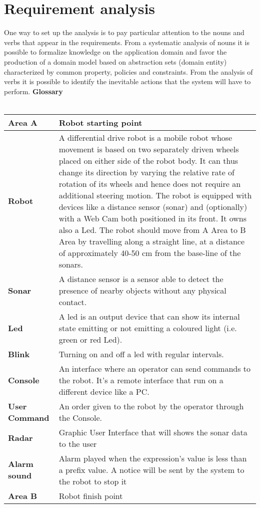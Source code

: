 \section{Requirement analysis}
One way to set up the analysis is to pay particular attention to the nouns and verbs that appear in the requirements. From a systematic analysis of nouns it is possible to formalize knowledge on the application domain and favor the production of a domain model based on abstraction sets (domain entity) characterized by common property, policies and constraints. From the analysis of verbs it is possible to identify the inevitable actions that the system will have to perform.
\clearpage
\textbf{Glossary}\\\\
\begin{tabular}{| l | p{10cm} |}
\hline
\textbf{Area A} & Robot starting point \\ \hline
\textbf{Robot} & A differential drive robot is a mobile robot whose movement is based on two separately driven wheels placed on either side of the robot body. It can thus change its direction by varying the relative rate of rotation of its wheels and hence does not require an additional steering motion. The robot is equipped with devices like a distance sensor (sonar) and (optionally) with a Web Cam both positioned in its front. It owns also a Led. The robot should move from A Area to B Area by travelling along a straight line, at a distance of approximately 40-50 cm from the base-line of the sonars. \\ \hline
\textbf{Sonar} & A distance sensor is a sensor able to detect the presence of nearby objects without any physical contact. \\ \hline
\textbf{Led} & A led is an output device that can show its internal state emitting or not emitting a coloured light (i.e. green or red Led). \\ \hline
\textbf{Blink} & Turning on and off a led with regular intervals. \\ \hline
\textbf{Console} & An interface where an operator can send commands to the robot. It's a remote interface that run on a different device like a PC.\\ \hline
\textbf{User Command} & An order given to the robot by the operator through the Console. \\ \hline
\textbf{Radar} & Graphic User Interface that will shows the sonar data to the user \\ \hline
\textbf{Alarm sound} & Alarm played when the expression's value is less than a prefix value. A notice will be sent by the system to the robot to stop it\\ \hline
\textbf{Area B} & Robot finish point \\ \hline
\end{tabular}



